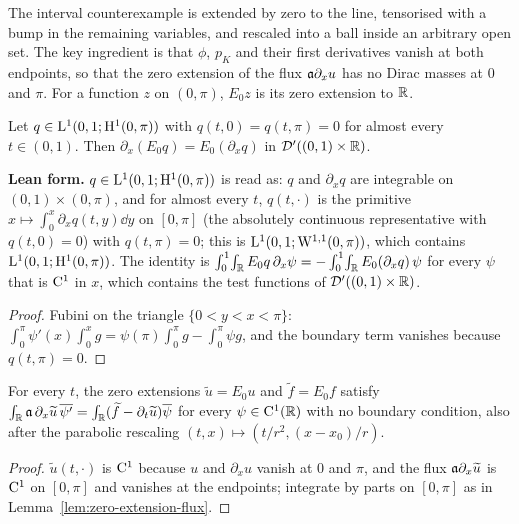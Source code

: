 The interval counterexample is extended by zero to the line, tensorised with a bump in the
remaining variables, and rescaled into a ball inside an arbitrary open set.  The key ingredient is
that $\phi$, $p_K$ and their first derivatives vanish at both endpoints, so that the zero extension
of the flux $\mathfrak{a}\partial_xu$ has no Dirac masses at $0$ and $\pi$.  For a function $z$ on $(0,\pi)$,
$E_0z$ is its zero extension to $\mathbb{R}$.

\begin{lemma}
  \label{lem:zero-extension-flux}
  \leanok
  Let $q\in\mathrm{L}^1(0,1;\mathrm{H}^1(0,\pi))$ with $q(t,0)=q(t,\pi)=0$ for almost every $t\in(0,1)$.  Then
  $\partial_x(E_0q)=E_0(\partial_xq)$ in $\mathcal D'((0,1)\times\mathbb{R})$.
\end{lemma}

\textbf{Lean form.}  $q\in\mathrm{L}^1(0,1;\mathrm{H}^1(0,\pi))$ is read as: $q$ and $\partial_xq$ are integrable
on $(0,1)\times(0,\pi)$, and for almost every $t$, $q(t,\cdot)$ is the primitive
$x\mapsto\int_0^x\partial_xq(t,y)\dd y$ on $[0,\pi]$ (the absolutely continuous representative with
$q(t,0)=0$) with $q(t,\pi)=0$; this is $\mathrm{L}^1(0,1;\mathrm{W}^{1,1}(0,\pi))$, which contains
$\mathrm{L}^1(0,1;\mathrm{H}^1(0,\pi))$.  The identity is
$\int_0^1\!\int_{\mathbb{R}} E_0q\,\partial_x\psi=-\int_0^1\!\int_{\mathbb{R}} E_0(\partial_xq)\,\psi$ for every $\psi$ that is
$\mathrm{C}^1$ in $x$, which contains the test functions of $\mathcal D'((0,1)\times\mathbb{R})$.

\begin{proof}
  \leanok
  Fubini on the triangle $\{0<y<x<\pi\}$: $\int_0^\pi\psi'(x)\int_0^xg=\psi(\pi)\int_0^\pi g-\int_0^\pi\psi g$,
  and the boundary term vanishes because $q(t,\pi)=0$.
\end{proof}

\begin{lemma}
  \label{lem:weak-line}
  \leanok
  For every $t$, the zero extensions $\widetilde u=E_0u$ and $\widetilde f=E_0f$ satisfy
  $\int_{\mathbb{R}}\mathfrak{a}\,\partial_x\widetilde u\,\overline{\psi'}=\int_{\mathbb{R}}(\widetilde f-\partial_t\widetilde u)\overline\psi$ for every
  $\psi\in\mathrm{C}^1(\mathbb{R})$ with no boundary condition, also after the parabolic rescaling
  $(t,x)\mapsto(t/r^2,(x-x_0)/r)$.
\end{lemma}

\begin{proof}
  \leanok
  $\widetilde u(t,\cdot)$ is $\mathrm{C}^1$ because $u$ and $\partial_xu$ vanish at $0$ and $\pi$, and the flux
  $\mathfrak{a}\partial_x\widetilde u$ is $\mathrm{C}^1$ on $[0,\pi]$ and vanishes at the endpoints; integrate by parts
  on $[0,\pi]$ as in Lemma~\ref{lem:zero-extension-flux}.
\end{proof}

